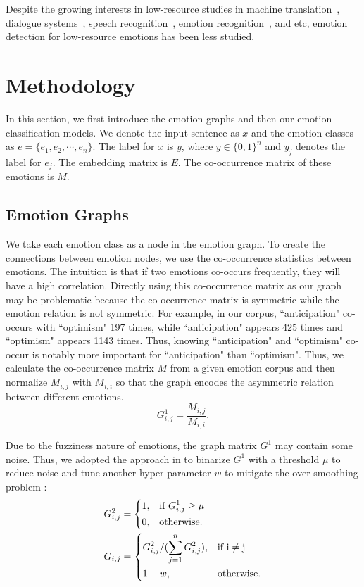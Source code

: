 \documentclass[11pt,a4paper]{article}
\begin{document}
Despite the growing interests in low-resource studies in machine translation~\cite{artetxe2017unsupervised,lample2017unsupervised}, dialogue systems~\cite{bapna2017towards,liu2019zero,liu2020coach}, speech recognition~\cite{miao2013deep,thomas2013deep,winata2020learning}, emotion recognition~\cite{haider2020emotion}, and etc, emotion detection for low-resource emotions has been less studied.


\section{Methodology}
In this section, we first introduce the emotion graphs and then our emotion classification models. We denote the input sentence as $x$ and the emotion classes as $e = \{e_1, e_2, \cdots, e_n\}$. The label for $x$ is $y$, where $y \in \{0,1\}^n$ and $y_j$ denotes the label for $e_j$. The embedding matrix is $E$. The co-occurrence matrix of these emotions is $M$. 

\subsection{Emotion Graphs}
We take each emotion class as a node in the emotion graph. To create the connections between emotion nodes, we use the co-occurrence statistics between emotions. The intuition is that if two emotions co-occurs frequently, they will have a high correlation. Directly using this co-occurrence matrix as our graph may be problematic because the co-occurrence matrix is symmetric while the emotion relation is not symmetric. For example, in our corpus, ``anticipation" co-occurs with ``optimism" 197 times, while ``anticipation" appears 425 times and ``optimism" appears 1143 times. Thus, knowing ``anticipation" and ``optimism" co-occur is notably more important for ``anticipation" than ``optimism". Thus, we calculate the co-occurrence matrix $M$ from a given emotion corpus and then normalize $M_{i,j}$ with $M_{i,i}$ so that the graph encodes the asymmetric relation between different emotions.
\begin{equation}
    G_{i, j}^1 = \frac{M_{i, j}}{M_{i,i}}.
\end{equation}

Due to the fuzziness nature of emotions, the graph matrix $G^1$ may contain some noise. Thus, we adopted the approach in \citet{chen2019multi} to binarize $G^1$ with a threshold $\mu$ to reduce noise and tune another hyper-parameter $w$ to mitigate the over-smoothing problem \cite{li2018deeper}:
\begin{align}
    G_{i, j}^2 &= 
\begin{dcases}
    1,     & \text{if } G_{i,j}^1 \geq \mu \\
    0,      & \text{otherwise}. 
\end{dcases} \\
    G_{i, j} &= 
\begin{dcases}
    G_{i,j}^2 / (\sum_{j=1}^{n} G_{i,j}^2) ,      & \text{if i} \neq \text{j}  \\
    1 - w,  & \text{otherwise}.
\end{dcases}
\end{align}
\end{document}
